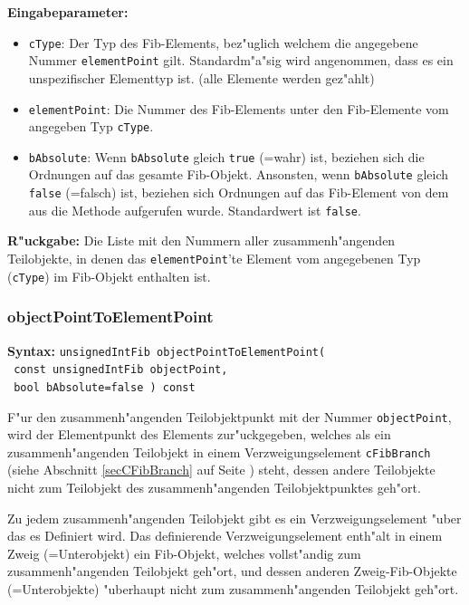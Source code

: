 \bigskip\noindent
\textbf{Eingabeparameter:}
\begin{itemize}
 \item \verb|cType|: Der Typ des Fib-Elements, bez"uglich welchem die angegebene Nummer \verb|elementPoint| gilt. Standardm"a"sig wird angenommen, dass es ein unspezifischer Elementtyp ist. (alle Elemente werden gez"ahlt)
 \item \verb|elementPoint|: Die Nummer des Fib-Elements unter den Fib-Elemente vom angegeben Typ \verb|cType|.
 \item \verb|bAbsolute|: Wenn \verb|bAbsolute| gleich \verb|true| (=wahr) ist, beziehen sich die Ordnungen auf das gesamte Fib-Objekt. Ansonsten, wenn \verb|bAbsolute| gleich \verb|false| (=falsch) ist, beziehen sich Ordnungen auf das Fib-Element von dem aus die Methode aufgerufen wurde. Standardwert ist \verb|false|.
\end{itemize}

\bigskip\noindent
\textbf{R"uckgabe:} Die Liste mit den Nummern aller zusammenh"angenden Teilobjekte, in denen das \verb|elementPoint|'te Element vom angegebenen Typ (\verb|cType|) im Fib-Objekt enthalten ist.


\subsubsection{objectPointToElementPoint}
\textbf{Syntax:} \verb|unsignedIntFib objectPointToElementPoint( | \\\verb| const unsignedIntFib objectPoint, | \\\verb| bool bAbsolute=false ) const|

\bigskip\noindent
F"ur den zusammenh"angenden Teilobjektpunkt mit der Nummer \verb|objectPoint|, wird der Elementpunkt des Elements zur"uckgegeben, welches als ein zusammenh"angenden Teilobjekt in einem Verzweigungselement \verb|cFibBranch| (siehe Abschnitt \ref{secCFibBranch} auf Seite \pageref{secCFibBranch} ) steht, dessen andere Teilobjekte nicht zum Teilobjekt des zusammenh"angenden Teilobjektpunktes geh"ort.

Zu jedem zusammenh"angenden Teilobjekt gibt es ein Verzweigungselement "uber das es Definiert wird. Das definierende Verzweigungselement enth"alt in einem Zweig (=Unterobjekt) ein Fib-Objekt, welches vollst"andig zum zusammenh"angenden Teilobjekt geh"ort, und dessen anderen Zweig-Fib-Objekte (=Unterobjekte) "uberhaupt nicht zum zusammenh"angenden Teilobjekt geh"ort.

